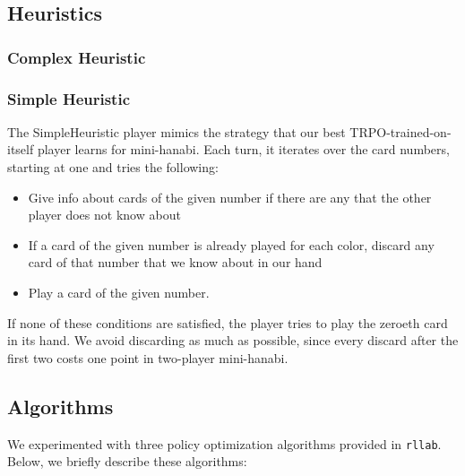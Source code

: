 \subsection{Heuristics}

\subsubsection{Complex Heuristic}

\subsubsection{Simple Heuristic}


The SimpleHeuristic player mimics the strategy that our best
TRPO-trained-on-itself player learns for mini-hanabi.
Each turn, it iterates over the card numbers, starting at one and tries the following:

\begin{itemize}[leftmargin=*]
\item Give info about cards of the given number if there are any that the other player does not know about
\item If a card of the given number is already played for each color, discard any card of that number that we know about in our hand
\item Play a card of the given number.
\end{itemize}

If none of these conditions are satisfied, the player tries to play the zeroeth card in
its hand. We avoid discarding as much as possible, since every discard after
the first two costs one point in two-player mini-hanabi.

\subsection{Algorithms}
We experimented with three policy optimization algorithms provided in
\texttt{rllab}. Below, we briefly describe these algorithms:

